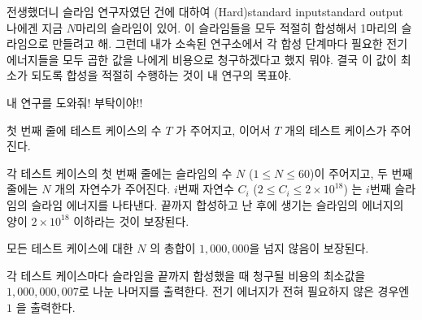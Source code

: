 \begin{problem}{전생했더니 슬라임 연구자였던 건에 대하여 (Hard)}{standard input}{standard output}
나에겐 지금 $N$마리의 슬라임이 있어. 이 슬라임들을 모두 적절히 합성해서
1마리의 슬라임으로 만들려고 해. 그런데 내가 소속된 연구소에서
각 합성 단계마다 필요한 전기 에너지들을 모두 곱한 값을 나에게 비용으로
청구하겠다고 했지 뭐야. 결국 이 값이 최소가 되도록 합성을 적절히 수행하는 것이 내 연구의 목표야.

내 연구를 도와줘! 부탁이야!!

\InputFile
첫 번째 줄에 테스트 케이스의 수 $T$ 가 주어지고, 이어서 $T$ 개의 테스트 케이스가 주어진다.

각 테스트 케이스의 첫 번째 줄에는 슬라임의 수 $N$ ($1 \le N \le 60$)이 주어지고, 두 번째 줄에는 $N$ 개의 자연수가 주어진다. $i$번째 자연수 $C_i$ ($2 \le C_i \le 2 \times 10^{18}$) 는 $i$번째 슬라임의 슬라임 에너지를 나타낸다. 끝까지 합성하고 난 후에 생기는 슬라임의 에너지의 양이 $2 \times 10^{18}$ 이하라는 것이 보장된다.

모든 테스트 케이스에 대한 $N$ 의 총합이 $1,000,000$을 넘지 않음이 보장된다.

\OutputFile
각 테스트 케이스마다 슬라임을 끝까지 합성했을 때 청구될 비용의 최소값을 $1,000,000,007$로 나눈 나머지를 출력한다.
전기 에너지가 전혀 필요하지 않은 경우엔 $1$ 을 출력한다.

\Example

\begin{example}
%
\end{example}

\end{problem}
